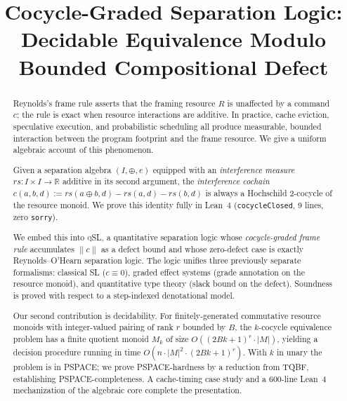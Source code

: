 \documentclass[acmsmall,sigplan,anonymous,review,screen]{acmart}
\theoremstyle{plain}
\theoremstyle{definition}
\newcommand{\qSL}{\textsc{qSL}\xspace}
\newcommand{\rs}{\mathit{rs}}
\newcommand{\norm}[1]{\|#1\|}
\newcommand{\lean}[1]{\texttt{#1}}
\begin{document}
\title{Cocycle-Graded Separation Logic: Decidable Equivalence Modulo
       Bounded Compositional Defect}

\begin{abstract}
Reynolds's frame rule asserts that the framing resource $R$ is unaffected
by a command $c$; the rule is exact when resource interactions are additive.
In practice, cache eviction, speculative execution, and probabilistic
scheduling all produce measurable, bounded interaction between the program
footprint and the frame resource.  We give a uniform algebraic account of
this phenomenon.

Given a separation algebra $(I, \oplus, e)$ equipped with an
\emph{interference measure} $\rs : I \times I \to \mathbb{R}$ additive
in its second argument, the \emph{interference cochain}
$c(a, b, d) := \rs(a \oplus b, d) - \rs(a, d) - \rs(b, d)$
is always a Hochschild 2-cocycle of the resource monoid.  We prove this
identity fully in Lean~4 (\lean{cocycleClosed}, 9 lines, zero
\lean{sorry}).

We embed this into \qSL, a quantitative separation logic whose
\emph{cocycle-graded frame rule} accumulates $\norm{c}$ as a defect bound
and whose zero-defect case is exactly Reynolds--O'Hearn separation logic.
The logic unifies three previously separate formalisms: classical SL
($c \equiv 0$), graded effect systems (grade annotation on the resource
monoid), and quantitative type theory (slack bound on the defect).
Soundness is proved with respect to a step-indexed denotational model.

Our second contribution is decidability.  For finitely-generated
commutative resource monoids with integer-valued pairing of rank $r$
bounded by $B$, the $k$-cocycle equivalence problem has a finite quotient
monoid $M_k$ of size $O((2Bk{+}1)^r \cdot |M|)$, yielding a decision
procedure running in time $O(n \cdot |M|^2 \cdot (2Bk{+}1)^r)$.  With $k$
in unary the problem is in PSPACE; we prove PSPACE-hardness by a reduction
from TQBF, establishing PSPACE-completeness.  A cache-timing case study and
a 600-line Lean~4 mechanization of the algebraic core complete the
presentation.
\end{abstract}


\maketitle
\end{document}
